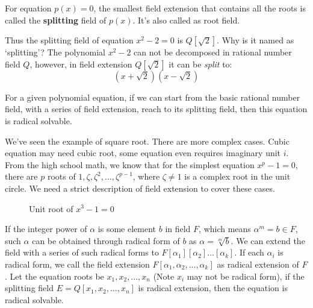 \documentclass[b5paper]{article}
\begin{document}
 
\begin{definition}
For equation $p(x) = 0$, the smallest field extension that contains all the roots is called the \textbf{splitting} field of $p(x)$. It's also called as root field.
\end{definition}

Thus the splitting field of equation $x^2 -2 = 0$ is $Q[\sqrt{2}]$. Why is it named as `splitting'? The polynomial $x^2-2$ can not be decomposed in rational number field $Q$, however, in field extension $Q[\sqrt{2}]$ it can be {\em split} to:
\[
(x + \sqrt{2}) (x - \sqrt{2})
\]

For a given polynomial equation, if we can start from the basic rational number field, with a series of field extension, reach to its splitting field, then this equation is radical solvable.

We've seen the example of square root. There are more complex cases. Cubic equation may need cubic root, some equation even requires imaginary unit $i$. From the high school math, we know that for the simplest equation $x^p-1=0$, there are $p$ roots of $1, \zeta, \zeta^2, ..., \zeta^{p-1}$, where $\zeta \neq 1$ is a complex root in the unit circle. We need a strict description of field extension to cover these cases.

\begin{figure}[htbp]
\centering
{}
\caption{Unit root of $x^3 - 1 = 0$}
\label{fig:root-of-unity}
\end{figure}

If the integer power of $\alpha$ is some element $b$ in field $F$, which means $\alpha^m = b \in F$, such $\alpha$ can be obtained through radical form of $b$ as $\alpha = \sqrt[m]{b}$. We can extend the field with a series of such radical forms to $F[\alpha_1][\alpha_2]...[\alpha_k]$. If each $\alpha_i$ is radical form, we call the field extension $F[\alpha_1, \alpha_2, ..., \alpha_k]$ as radical extension of $F$. Let the equation roots be $x_1, x_2, ..., x_n$ (Note $x_i$ may not be radical form), if the splitting field $E = Q[x_1, x_2, ..., x_n]$ is radical extension, then the equation is radical solvable.
\end{document}
